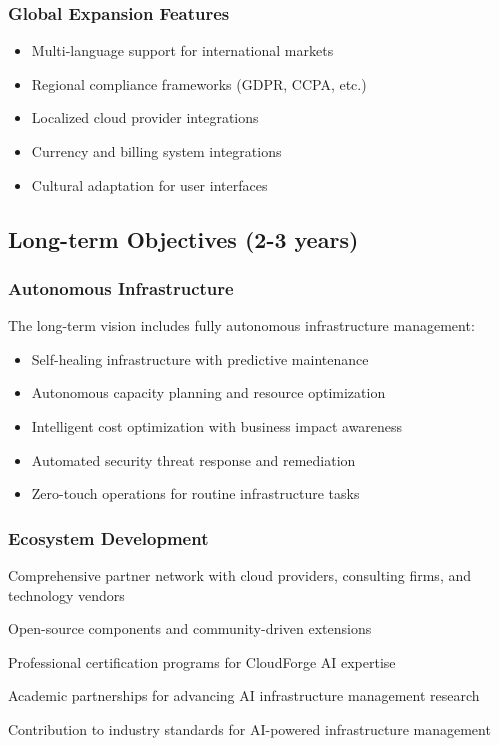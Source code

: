 \subsubsection{Global Expansion Features}

\begin{itemize}
    \item Multi-language support for international markets
    \item Regional compliance frameworks (GDPR, CCPA, etc.)
    \item Localized cloud provider integrations
    \item Currency and billing system integrations
    \item Cultural adaptation for user interfaces
\end{itemize}

\subsection{Long-term Objectives (2-3 years)}

\subsubsection{Autonomous Infrastructure}

The long-term vision includes fully autonomous infrastructure management:

\begin{itemize}
    \item Self-healing infrastructure with predictive maintenance
    \item Autonomous capacity planning and resource optimization
    \item Intelligent cost optimization with business impact awareness
    \item Automated security threat response and remediation
    \item Zero-touch operations for routine infrastructure tasks
\end{itemize}

\subsubsection{Ecosystem Development}

\begin{description}[leftmargin=*]
    \item[Partner Ecosystem] Comprehensive partner network with cloud providers, consulting firms, and technology vendors
    \item[Developer Community] Open-source components and community-driven extensions
    \item[Training and Certification] Professional certification programs for CloudForge AI expertise
    \item[Research Collaboration] Academic partnerships for advancing AI infrastructure management research
    \item[Industry Standards] Contribution to industry standards for AI-powered infrastructure management
\end{description}

